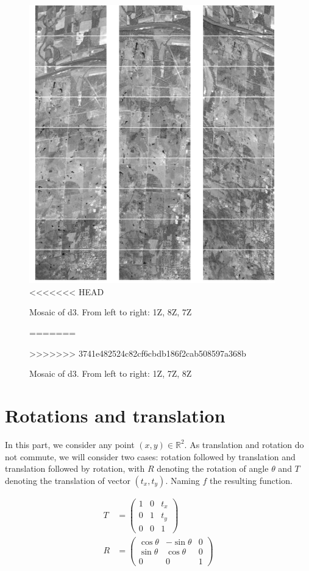 \documentclass[paper=a4, fontsize=11pt, onecolumn, tikz, dvipsnames, svgnames, x11names]{article}
\begin{document}
\newpage
\begin{figure}
    \centering
    \includegraphics[width = 0.95\textwidth]{d3.png}
<<<<<<< HEAD
    \caption{Mosaic of d3. From left to right: 1Z, 8Z, 7Z}
    \label{fig_mosaic_d3}
=======
    \caption{Mosaic of d3. From left to right: 1Z, 7Z, 8Z}
    \label{}
>>>>>>> 3741e482524c82cf6cbdb186f2cab508597a368b
\end{figure}


\appendix

\section{Rotations and translation}

In this part, we consider any point \((x, y) \in \mathbb{R}^2\). As translation and rotation do not commute, we will consider two cases: rotation followed by translation and translation followed by rotation, with \(R\) denoting the rotation of angle \(\theta\) and \(T\) denoting the translation of vector \((t_x, t_y)\). Naming \(f\) the resulting function.

\begin{align*}
    T &=
    \begin{pmatrix}
    1 & 0 & t_x \\
    0 & 1 & t_y \\
    0 & 0 & 1
    \end{pmatrix}
    \\
    R &=
    \begin{pmatrix}
    \cos \theta & -\sin \theta & 0 \\
    \sin \theta & \cos \theta & 0 \\
    0 & 0 & 1
    \end{pmatrix}
\end{align*}
\end{document}
